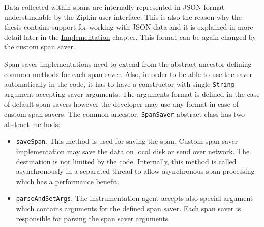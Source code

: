 Data collected within spans are internally represented in JSON format understandable by the Zipkin user interface. This is also the reason why the thesis contains support for working with JSON data and  it is explained in more detail later in the  \hyperref[chap:implementation]{Implementation} chapter. This format can be again changed by the custom span saver.

Span saver implementations need to extend from the abstract ancestor defining common methods for each span saver. Also, in order to be able to use the saver automatically in the code, it has to have a constructor with single \texttt{String} argument accepting saver arguments. The arguments format is defined in the case of default span savers however the developer may use any format in case of custom span savers. The common ancestor, \texttt{SpanSaver} abstract class has two abstract methods:
\begin{itemize}
	\item \texttt{saveSpan}. This method is used for saving the span. Custom span saver implementation may save the data on local disk or send over network. The destination is not limited by the code. Internally, this method is called asynchronously in a separated thread to allow asynchronous span processing which has a performance benefit.
	\item \texttt{parseAndSetArgs}. The instrumentation agent accepts also special argument which contains arguments for the defined span saver. Each span saver is responsible for parsing the span saver arguments.
\end{itemize}

